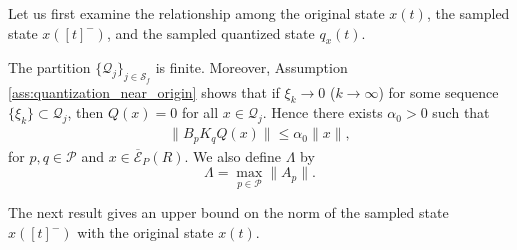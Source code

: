 \documentclass[a4, 11pt]{article}
\begin{document}
Let us first examine the relationship among 
the original state $x(t)$, the sampled state $x([t]^-)$,
and the sampled quantized state $q_x(t)$.

The partition $\{\mathcal{Q}_j\}_{j \in \mathcal{S}_f}$ is finite. 
Moreover, 
Assumption \ref{ass:quantization_near_origin} shows that
if $\xi_{k} \to 0$ ($k \to \infty$) for some sequence $\{\xi_k\} \subset \mathcal{Q}_j$,
then $Q(x) = 0$ for all $x \in \mathcal{Q}_j$.
Hence
there exists $\alpha_0 > 0$ such that
\begin{align}
\|B_pK_q Q(x)\| \leq \alpha_0 \|x\|, \label{eq:alpha0_bound}
\end{align}
for $p,q \in \mathcal{P}$ and $x \in
\overline{\mathcal{E}}_P(R)$.
We also define $\Lambda$ by 
\[
\Lambda = \max_{p \in \mathcal{P}} \|A_p\|.
\]

The next result gives an upper bound on
the norm of the sampled state $x([t]^-)$ with
the original state $x(t)$.
\end{document}
